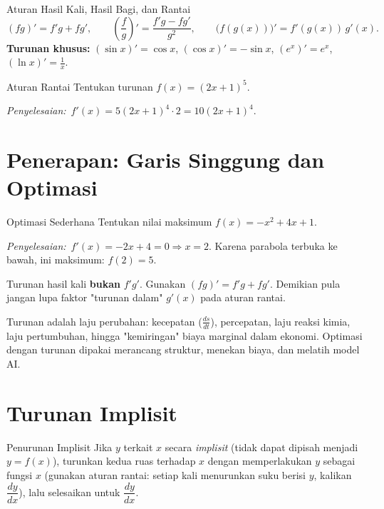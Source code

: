 \documentclass[11pt,a4paper]{report}
\theoremstyle{gaya}
\newcommand{\jawab}{\par\smallskip\noindent\textit{\textcolor{oranye}{Penyelesaian:}}\ }
\begin{document}
\begin{konsep}{Aturan Hasil Kali, Hasil Bagi, dan Rantai}
\[
(fg)'=f'g+fg', \qquad \left(\frac fg\right)'=\frac{f'g-fg'}{g^2}, \qquad \big(f(g(x))\big)'=f'(g(x))\,g'(x).
\]
\textbf{Turunan khusus:} $(\sin x)'=\cos x$, $(\cos x)'=-\sin x$, $(e^x)'=e^x$, $(\ln x)'=\tfrac1x$.
\end{konsep}

\begin{contoh}{Aturan Rantai}
Tentukan turunan $f(x)=(2x+1)^5$.

\jawab $f'(x)=5(2x+1)^4\cdot2=10(2x+1)^4.$
\end{contoh}

\section{Penerapan: Garis Singgung dan Optimasi}
\begin{contoh}{Optimasi Sederhana}
Tentukan nilai maksimum $f(x)=-x^2+4x+1$.

\jawab $f'(x)=-2x+4=0\Rightarrow x=2$. Karena parabola terbuka ke bawah, ini maksimum: $f(2)=5.$
\end{contoh}

\begin{kesalahan}
Turunan hasil kali \textbf{bukan} $f'g'$. Gunakan $(fg)'=f'g+fg'$. Demikian pula jangan lupa faktor "turunan dalam" $g'(x)$ pada aturan rantai.
\end{kesalahan}

\begin{dunianyata}
Turunan adalah laju perubahan: kecepatan ($\tfrac{ds}{dt}$), percepatan, laju reaksi kimia, laju pertumbuhan, hingga "kemiringan" biaya marginal dalam ekonomi. Optimasi dengan turunan dipakai merancang struktur, menekan biaya, dan melatih model AI.
\end{dunianyata}

\section{Turunan Implisit}
\begin{konsep}{Penurunan Implisit}
Jika $y$ terkait $x$ secara \emph{implisit} (tidak dapat dipisah menjadi $y=f(x)$), turunkan kedua ruas terhadap $x$ dengan memperlakukan $y$ sebagai fungsi $x$ (gunakan aturan rantai: setiap kali menurunkan suku berisi $y$, kalikan $\dfrac{dy}{dx}$), lalu selesaikan untuk $\dfrac{dy}{dx}$.
\end{konsep}
\end{document}
